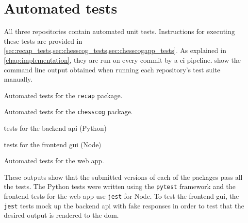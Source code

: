 \documentclass[../../report.tex]{subfiles}
\begin{document}
\section{Automated tests}
All three repositories contain automated unit tests.
Instructions for executing these tests are provided in \cref{sec:recap_tests,sec:chesscog_tests,sec:chesscogapp_tests}.
As explained in \cref{chap:implementation}, they are run on every commit by a \gls{ci} pipeline.
 show the command line output obtained when running each repository's test suite manually.
\begin{listing}
    
    \caption{Automated tests for the \texttt{recap} package.}
    \label{lst:tests_recap}
\end{listing}%
\begin{listing}
    
    \caption{Automated tests for the \texttt{chesscog} package.}
    \label{lst:tests_chesscog}
\end{listing}%
\begin{listing}
    \begin{sublisting}[b]{\textwidth}
        
        \caption{tests for the backend \acs{api} (Python)}
    \end{sublisting}
    \medskip\par
    \begin{sublisting}[b]{\textwidth}
        
        \caption{tests for the frontend \acs{gui} (Node)}
    \end{sublisting}
    \caption{Automated tests for the web app.}
    \label{lst:tests_chesscogapp}
\end{listing}%
These outputs show that the submitted versions of each of the packages pass all the tests.
The Python tests were written using the \texttt{pytest} framework and the frontend tests for the web app use \texttt{jest} for Node.
To test the frontend \gls{gui}, the \texttt{jest} tests mock up the backend \gls{api} with fake responses in order to test that the desired output is rendered to the \gls{dom}.
\end{document}
